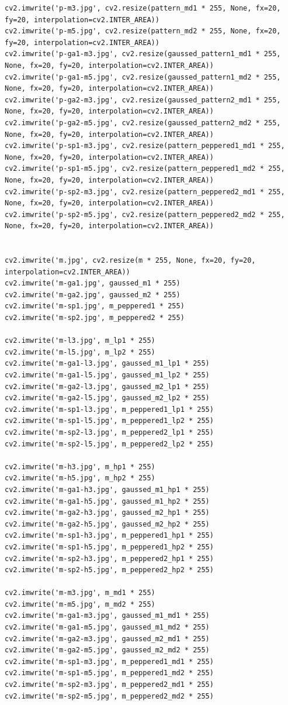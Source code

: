 \documentclass{article}
\begin{document}
\begin{verbatim}
cv2.imwrite('p-m3.jpg', cv2.resize(pattern_md1 * 255, None, fx=20, fy=20, interpolation=cv2.INTER_AREA))
cv2.imwrite('p-m5.jpg', cv2.resize(pattern_md2 * 255, None, fx=20, fy=20, interpolation=cv2.INTER_AREA))
cv2.imwrite('p-ga1-m3.jpg', cv2.resize(gaussed_pattern1_md1 * 255, None, fx=20, fy=20, interpolation=cv2.INTER_AREA))
cv2.imwrite('p-ga1-m5.jpg', cv2.resize(gaussed_pattern1_md2 * 255, None, fx=20, fy=20, interpolation=cv2.INTER_AREA))
cv2.imwrite('p-ga2-m3.jpg', cv2.resize(gaussed_pattern2_md1 * 255, None, fx=20, fy=20, interpolation=cv2.INTER_AREA))
cv2.imwrite('p-ga2-m5.jpg', cv2.resize(gaussed_pattern2_md2 * 255, None, fx=20, fy=20, interpolation=cv2.INTER_AREA))
cv2.imwrite('p-sp1-m3.jpg', cv2.resize(pattern_peppered1_md1 * 255, None, fx=20, fy=20, interpolation=cv2.INTER_AREA))
cv2.imwrite('p-sp1-m5.jpg', cv2.resize(pattern_peppered1_md2 * 255, None, fx=20, fy=20, interpolation=cv2.INTER_AREA))
cv2.imwrite('p-sp2-m3.jpg', cv2.resize(pattern_peppered2_md1 * 255, None, fx=20, fy=20, interpolation=cv2.INTER_AREA))
cv2.imwrite('p-sp2-m5.jpg', cv2.resize(pattern_peppered2_md2 * 255, None, fx=20, fy=20, interpolation=cv2.INTER_AREA))


cv2.imwrite('m.jpg', cv2.resize(m * 255, None, fx=20, fy=20, interpolation=cv2.INTER_AREA))
cv2.imwrite('m-ga1.jpg', gaussed_m1 * 255)
cv2.imwrite('m-ga2.jpg', gaussed_m2 * 255)
cv2.imwrite('m-sp1.jpg', m_peppered1 * 255)
cv2.imwrite('m-sp2.jpg', m_peppered2 * 255)

cv2.imwrite('m-l3.jpg', m_lp1 * 255)
cv2.imwrite('m-l5.jpg', m_lp2 * 255)
cv2.imwrite('m-ga1-l3.jpg', gaussed_m1_lp1 * 255)
cv2.imwrite('m-ga1-l5.jpg', gaussed_m1_lp2 * 255)
cv2.imwrite('m-ga2-l3.jpg', gaussed_m2_lp1 * 255)
cv2.imwrite('m-ga2-l5.jpg', gaussed_m2_lp2 * 255)
cv2.imwrite('m-sp1-l3.jpg', m_peppered1_lp1 * 255)
cv2.imwrite('m-sp1-l5.jpg', m_peppered1_lp2 * 255)
cv2.imwrite('m-sp2-l3.jpg', m_peppered2_lp1 * 255)
cv2.imwrite('m-sp2-l5.jpg', m_peppered2_lp2 * 255)

cv2.imwrite('m-h3.jpg', m_hp1 * 255)
cv2.imwrite('m-h5.jpg', m_hp2 * 255)
cv2.imwrite('m-ga1-h3.jpg', gaussed_m1_hp1 * 255)
cv2.imwrite('m-ga1-h5.jpg', gaussed_m1_hp2 * 255)
cv2.imwrite('m-ga2-h3.jpg', gaussed_m2_hp1 * 255)
cv2.imwrite('m-ga2-h5.jpg', gaussed_m2_hp2 * 255)
cv2.imwrite('m-sp1-h3.jpg', m_peppered1_hp1 * 255)
cv2.imwrite('m-sp1-h5.jpg', m_peppered1_hp2 * 255)
cv2.imwrite('m-sp2-h3.jpg', m_peppered2_hp1 * 255)
cv2.imwrite('m-sp2-h5.jpg', m_peppered2_hp2 * 255)

cv2.imwrite('m-m3.jpg', m_md1 * 255)
cv2.imwrite('m-m5.jpg', m_md2 * 255)
cv2.imwrite('m-ga1-m3.jpg', gaussed_m1_md1 * 255)
cv2.imwrite('m-ga1-m5.jpg', gaussed_m1_md2 * 255)
cv2.imwrite('m-ga2-m3.jpg', gaussed_m2_md1 * 255)
cv2.imwrite('m-ga2-m5.jpg', gaussed_m2_md2 * 255)
cv2.imwrite('m-sp1-m3.jpg', m_peppered1_md1 * 255)
cv2.imwrite('m-sp1-m5.jpg', m_peppered1_md2 * 255)
cv2.imwrite('m-sp2-m3.jpg', m_peppered2_md1 * 255)
cv2.imwrite('m-sp2-m5.jpg', m_peppered2_md2 * 255)


\end{verbatim}
\end{document}
